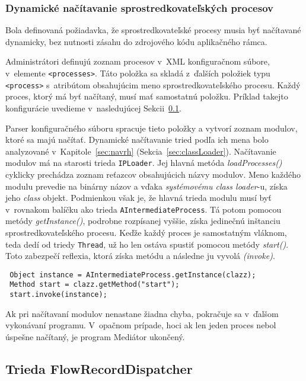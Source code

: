 \subsubsection{Dynamické načítavanie sprostredkovateľských procesov} \label{sec:intermediate_load}

Bola definovaná požiadavka, že sprostredkovateľské procesy musia byť načítavané dynamicky, bez nutnosti
zásahu do zdrojového kódu aplikačného rámca. 

Administrátori definujú zoznam procesov v~XML konfiguračnom súbore, v~elemente \verb|<processes>|. 
Táto položka sa skladá z~ďalších položiek typu \verb|<process>| s~atribútom 
obsahujúcim meno sprostredkovateľského procesu. Každý proces, ktorý má byť načítaný, musí mať 
samostatnú položku. Príklad takejto konfigurácie uvedieme v~nasledujúcej 
Sekcii~\ref{sec:FlowRecordDispatcher}.

Parser konfiguračného súboru spracuje tieto položky a vytvorí zoznam modulov, ktoré sa majú načítať.
Dynamické načítavanie tried podľa ich mena bolo analyzované v~Kapitole~\ref{sec:navrh} 
(Sekcia~\ref{sec:classLoader}). Načítavanie modulov má na starosti trieda \verb|IPLoader|. Jej hlavná 
metóda
\emph{loadProcesses()} cyklicky prechádza zoznam reťazcov obsahujúcich názvy modulov. Meno každého 
modulu prevedie na binárny názov a vďaka \emph{systémovému class loader}-u, získa jeho 
\emph{class} objekt. Podmienkou však je, že hlavná trieda modulu musí byť v~rovnakom balíčku ako trieda
\verb|AIntermediateProcess|. Tá potom pomocou metódy \emph{getInstance()}, podrobne rozpísanej vyššie, 
získa jedinečnú inštanciu sprostredkovateľského procesu. Keďže každý proces je samostatným vláknom, teda 
dedí od triedy \verb|Thread|, už ho len ostáva spustiť pomocou metódy \emph{start()}. Toto zabezpečí 
reflexia, ktorá získa metódu a následne ju vyvolá \emph{(invoke)}.
\begin{verbatim}
 Object instance = AIntermediateProcess.getInstance(clazz);
 Method start = clazz.getMethod("start");
 start.invoke(instance);
\end{verbatim}

Ak pri načítavaní modulov nenastane žiadna chyba, pokračuje sa v~ďalšom vykonávaní programu. V~opačnom 
prípade, hoci ak len jeden proces nebol úspešne načítaný, je program Mediátor ukončený.




\subsection{Trieda FlowRecordDispatcher} \label{sec:FlowRecordDispatcher}


